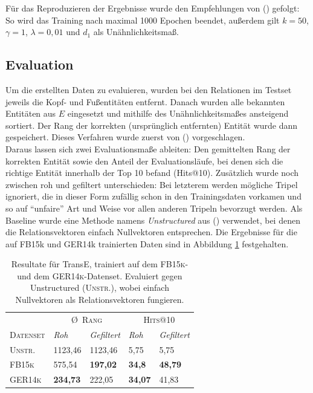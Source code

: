 Für das Reproduzieren der Ergebnisse wurde den Empfehlungen von (\cite{bordes2013translating}) gefolgt: So wird das Training
nach maximal 1000 Epochen beendet, außerdem gilt $k = 50$, $\gamma = 1$, $\lambda = 0,01$ und $d_1$ als Unähnlichkeitsmaß.

\subsection{Evaluation}\label{sec:transe-eval}

Um die erstellten Daten zu evaluieren, wurden bei den Relationen im Testset jeweils die Kopf- und Fußentitäten entfernt.
Danach wurden alle bekannten Entitäten aus $E$ eingesetzt und mithilfe des Unähnlichkeitsmaßes ansteigend sortiert. Der Rang
der korrekten (ursprünglich entfernten) Entität wurde dann gespeichert. Dieses Verfahren wurde zuerst von (\cite{bordes2011learning})
vorgeschlagen.\\

Daraus lassen sich zwei Evaluationsmaße ableiten: Den gemittelten Rang der korrekten Entität sowie den Anteil
der Evaluationsläufe, bei denen sich die richtige Entität innerhalb der Top 10 befand (Hits@10). Zusätzlich wurde noch
zwischen roh und gefiltert unterschieden: Bei letzterem werden mögliche Tripel ignoriert, die in dieser Form zufällig schon in
den Trainingsdaten vorkamen und so auf ``unfaire'' Art und Weise vor allen anderen Tripeln bevorzugt werden.
Als Baseline wurde eine Methode namens \emph{Unstructured} aus (\cite{bordes2013translating}) verwendet, bei denen
die Relationsvektoren einfach Nullvektoren entsprechen.
Die Ergebnisse für die auf FB15k und GER14k trainierten Daten sind in Abbildung \ref{fig:results1} festgehalten.

\begin{table}[h]
  \centering
  \def\arraystretch{1.5}
  \begin{tabular}{@{}lllll@{}}
    \toprule
     & \multicolumn{2}{c}{\textsc{\O\ Rang}} & \multicolumn{2}{c}{\textsc{Hits@10}} \\ \cmidrule(l{2pt}r{2pt}){2-3} \cmidrule(l{2pt}r{2pt}){4-5}
     \textsc{Datenset} & \emph{Roh} & \emph{Gefiltert} & \emph{Roh} & \emph{Gefiltert} \\
     \toprule
     \textsc{Unstr.} & 1123,46 & 1123,46 & 5,75 & 5,75 \\
     \textsc{FB15k} & 575,54 & \textbf{197,02} & \textbf{34,8} & \textbf{48,79} \\
     \textsc{GER14k} & \textbf{234,73} & 222,05 & \textbf{34,07} & 41,83 \\
     \bottomrule
  \end{tabular}
  \caption[Resultate für TransE mit \textsc{FB15k} und \textsc{GER14k}]{Resultate für TransE, trainiert auf dem
  \textsc{FB15k}- und dem \textsc{GER14k}-Datenset. Evaluiert gegen Unstructured (\textsc{Unstr.}), wobei einfach
  Nullvektoren als Relationsvektoren fungieren.\label{fig:results1}}
\end{table}

